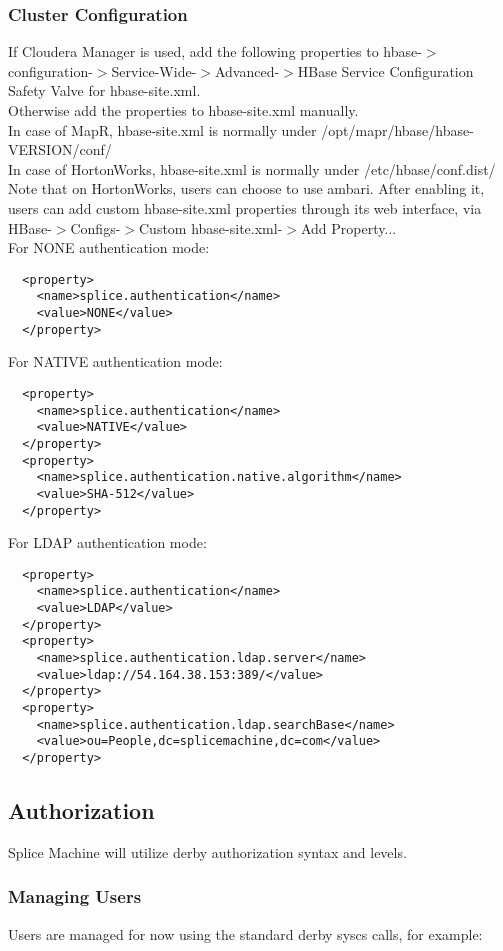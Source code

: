\documentclass{article}
\begin{document}
\subsubsection{Cluster Configuration}
If Cloudera Manager is used, add the following properties to hbase-$>$configuration-$>$Service-Wide-$>$Advanced-$>$HBase Service Configuration Safety Valve for hbase-site.xml. \\
Otherwise add the properties to hbase-site.xml manually. \\
In case of MapR, hbase-site.xml is normally under /opt/mapr/hbase/hbase-VERSION/conf/ \\
In case of HortonWorks, hbase-site.xml is normally under /etc/hbase/conf.dist/ \\ 
Note that on HortonWorks, users can choose to use ambari. After enabling it, users can add custom hbase-site.xml properties through its web interface, via HBase-$>$Configs-$>$Custom hbase-site.xml-$>$Add Property...  \\ 
For NONE authentication mode:
\begin{lstlisting}
  <property> 
    <name>splice.authentication</name> 
    <value>NONE</value> 
  </property> 
\end{lstlisting}
For NATIVE authentication mode: 
\begin{lstlisting}
  <property> 
    <name>splice.authentication</name> 
    <value>NATIVE</value> 
  </property> 
  <property> 
    <name>splice.authentication.native.algorithm</name> 
    <value>SHA-512</value> 
  </property> 
\end{lstlisting} 
For LDAP authentication mode: 
\begin{lstlisting}
  <property> 
    <name>splice.authentication</name> 
    <value>LDAP</value> 
  </property> 
  <property> 
    <name>splice.authentication.ldap.server</name> 
    <value>ldap://54.164.38.153:389/</value> 
  </property> 
  <property> 
    <name>splice.authentication.ldap.searchBase</name> 
    <value>ou=People,dc=splicemachine,dc=com</value> 
  </property> 
\end{lstlisting}
 

\subsection{Authorization}
Splice Machine will utilize derby authorization syntax and levels. 

\subsubsection{Managing Users}
Users are managed for now using the standard derby syscs calls, for example:
\end{document}
